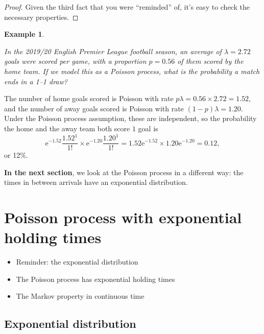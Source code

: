 \documentclass[
  a4paper,
]{article}
\providecommand{\tightlist}{%
  \setlength{\itemsep}{0pt}\setlength{\parskip}{0pt}}
\theoremstyle{definition}
\theoremstyle{definition}
\newtheorem{example}{Example}[section]
\theoremstyle{definition}
\theoremstyle{remark}
\begin{document}
\begin{proof}

Given the third fact that you were ``reminded'' of, it's easy to check the necessary properties.

\end{proof}

\begin{example}
\protect\hypertarget{exm:pois-ex-4}{}\label{exm:pois-ex-4}

\emph{In the 2019/20 English Premier League football season, an average of \(\lambda = 2.72\) goals were scored per game, with a proportion \(p = 0.56\) of them scored by the home team. If we model this as a Poisson process, what is the probability a match ends in a 1--1 draw?}

The number of home goals scored is Poisson with rate \(p\lambda = 0.56\times 2.72 = 1.52\), and the number of away goals scored is Poisson with rate \((1-p)\lambda = 1.20\). Under the Poisson process assumption, these are independent, so the probability the home and the away team both score \(1\) goal is
\[ \mathrm{e}^{-1.52} \frac{1.52^1}{1!} \times  \mathrm{e}^{-1.20} \frac{1.20^1}{1!} = 1.52\mathrm{e}^{-1.52} \times 1.20 \mathrm{e}^{-1.20} =  0.12, \]
or 12\%.

\end{example}

\textbf{In the next section}, we look at the Poisson process in a different way: the times in between arrivals have an exponential distribution.

\hypertarget{S14-poisson-exponential}{%
\section{Poisson process with exponential holding times}\label{S14-poisson-exponential}}

\begin{itemize}
\tightlist
\item
  Reminder: the exponential distribution
\item
  The Poisson process has exponential holding times
\item
  The Markov property in continuous time
\end{itemize}

\newcommand{\Exp}{\operatorname{Exp}}

\hypertarget{exponential}{%
\subsection{Exponential distribution}\label{exponential}}
\end{document}
